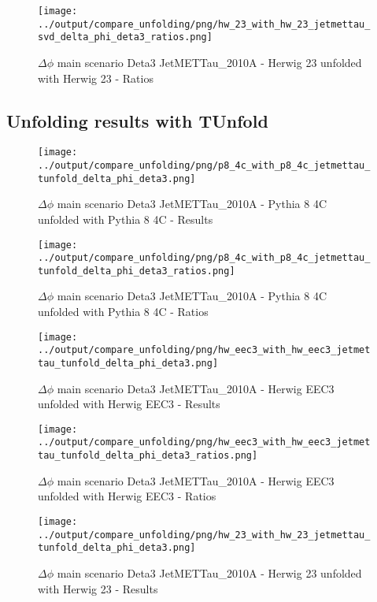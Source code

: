 \documentclass[11pt]{book}
\begin{document}
\begin{figure}[ht]
\centering
\texttt{[image: ../output/compare\_unfolding/png/hw\_23\_with\_hw\_23\_jetmettau\_svd\_delta\_phi\_deta3\_ratios.png]}
\caption{$\Delta\phi$ main scenario Deta3 JetMETTau\_2010A - Herwig 23 unfolded with Herwig 23 - Ratios}
\label{hw_23_hw_23_jetmettau_svd_delta_phi_deta3_b}
\end{figure}


\clearpage
\subsection{Unfolding results with TUnfold}
\begin{figure}[ht]
\centering
\texttt{[image: ../output/compare\_unfolding/png/p8\_4c\_with\_p8\_4c\_jetmettau\_tunfold\_delta\_phi\_deta3.png]}
\caption{$\Delta\phi$ main scenario Deta3 JetMETTau\_2010A - Pythia 8 4C unfolded with Pythia 8 4C - Results}
\label{p8_p8_jetmettau_tunfold_delta_phi_deta3_a}
\end{figure}

\begin{figure}[ht]
\centering
\texttt{[image: ../output/compare\_unfolding/png/p8\_4c\_with\_p8\_4c\_jetmettau\_tunfold\_delta\_phi\_deta3\_ratios.png]}
\caption{$\Delta\phi$ main scenario Deta3 JetMETTau\_2010A - Pythia 8 4C unfolded with Pythia 8 4C - Ratios}
\label{p8_p8_jetmettau_tunfold_delta_phi_deta3_b}
\end{figure}

\begin{figure}[ht]
\centering
\texttt{[image: ../output/compare\_unfolding/png/hw\_eec3\_with\_hw\_eec3\_jetmettau\_tunfold\_delta\_phi\_deta3.png]}
\caption{$\Delta\phi$ main scenario Deta3 JetMETTau\_2010A - Herwig EEC3 unfolded with Herwig EEC3 - Results}
\label{hw_eec3_hw_eec3_jetmettau_tunfold_delta_phi_deta3_a}
\end{figure}

\begin{figure}[ht]
\centering
\texttt{[image: ../output/compare\_unfolding/png/hw\_eec3\_with\_hw\_eec3\_jetmettau\_tunfold\_delta\_phi\_deta3\_ratios.png]}
\caption{$\Delta\phi$ main scenario Deta3 JetMETTau\_2010A - Herwig EEC3 unfolded with Herwig EEC3 - Ratios}
\label{hw_eec3_hw_eec3_jetmettau_tunfold_delta_phi_deta3_b}
\end{figure}

\begin{figure}[ht]
\centering
\texttt{[image: ../output/compare\_unfolding/png/hw\_23\_with\_hw\_23\_jetmettau\_tunfold\_delta\_phi\_deta3.png]}
\caption{$\Delta\phi$ main scenario Deta3 JetMETTau\_2010A - Herwig 23 unfolded with Herwig 23 - Results}
\label{hw_23_hw_23_jetmettau_tunfold_delta_phi_deta3_a}
\end{figure}
\end{document}
